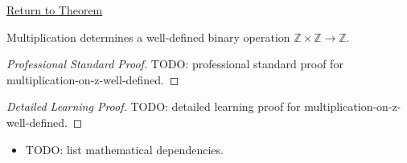 \newpage
{}
\label{prf:multiplication-on-z-well-defined}

\begin{remark*}[Return]
\hyperref[thm:multiplication-on-z-well-defined]{Return to Theorem}
\end{remark*}

\begin{theorem*}
Multiplication determines a well-defined binary operation
$\mathbb{Z}\times\mathbb{Z}\to\mathbb{Z}$.
\end{theorem*}

\begin{proof}[Professional Standard Proof]
\LRAProofBodyStart
TODO: professional standard proof for multiplication-on-z-well-defined.
\end{proof}

\begin{proof}[Detailed Learning Proof]
\LRAProofBodyStart
TODO: detailed learning proof for multiplication-on-z-well-defined.
\end{proof}

\begin{remark*}
\end{remark*}

\begin{dependencies}
\begin{itemize}
  \item TODO: list mathematical dependencies.
\end{itemize}
\end{dependencies}

\clearpage
